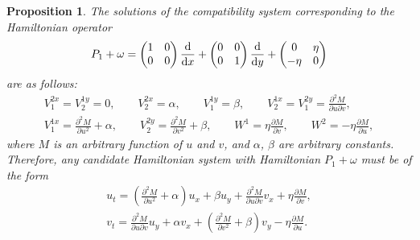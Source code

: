 \documentclass[10pt,a4paper]{amsart}
\numberwithin{equation}{section}
\newtheorem{Proposition}[Theorem]{Proposition}
 { \theoremstyle{definition}
\newtheorem{Definition}[Theorem]{Definition}
\newtheorem{Note}[Theorem]{Note}
\newtheorem{Example}[Theorem]{Example}
\newtheorem{Remark}[Theorem]{Remark} }
\begin{document}
\begin{Proposition}\label{proposition4.2}
The solutions of the compatibility system corresponding to the Hamiltonian operator
\begin{gather*}
P_1+\omega=\begin{pmatrix} 1&0\\0&0\\ \end{pmatrix} \frac{\rm d}{{\rm d}x}+\begin{pmatrix} 0&0\\0&1\\ \end{pmatrix} \frac{\rm d}{{\rm d}y}+\begin{pmatrix} 0&\eta\\-\eta&0\\ \end{pmatrix}
\end{gather*}
are as follows:
\begin{gather*}
V^{2x}_1=V^{1y}_2=0, \qquad V^{2x}_2=\alpha, \qquad V^{1y}_1=\beta,\qquad
V^{1x}_2=V^{2y}_1=\frac{\partial^2M}{\partial u\partial v}, \\ V^{1x}_1=\frac{\partial^2M}{\partial u^2}+\alpha, \qquad V^{2y}_2=\frac{\partial^2M}{\partial v^2}+\beta,\qquad
W^1=\eta\frac{\partial M}{\partial v}, \qquad W^2=-\eta\frac{\partial M}{\partial u},
\end{gather*}
where $M$ is an arbitrary function of $u$ and $v$, and $\alpha$, $\beta$ are arbitrary constants. Therefore, any candidate Hamiltonian system with Hamiltonian $P_1+\omega$ must be of the form
\begin{gather}
u_t=\left(\frac{\partial^2 M}{\partial u^2}+\alpha\right)u_x+\beta u_y+\frac{\partial^2 M}{\partial u\partial v}v_x+\eta\frac{\partial M}{\partial v},\nonumber\\
v_t=\frac{\partial^2 M}{\partial u\partial v}u_y+\alpha v_x+\left(\frac{\partial^2 M}{\partial v^2}+\beta\right)v_y-\eta\frac{\partial M}{\partial u}.\label{eq:solcomp1}
\end{gather}
\end{Proposition}
\end{document}
